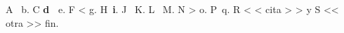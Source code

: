 \documentclass{article}
\begin{document}
A~ b. C \textbf{d~} e. F < g. H~\textbf{i}. J~
K. L~  %
M. N > o. P~{}q. R < < cita > > y S << otra >> fin.
\end{document}
